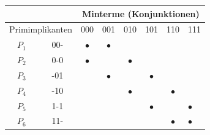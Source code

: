 \documentclass[12pt]{report}
\begin{document}
\begin{figure}[H]
  \begin{minipage}{0.6\textwidth}
    \begin{table}[H]
      \centering
      \begin{tabular}{|cc|cccccl|}
        \hline
                                              &     & \multicolumn{6}{c|}{Minterme (Konjunktionen)}                                                                                                                              \\ \hline
        \multicolumn{2}{|c|}{Primimplikanten} & 000 & 001                                           & 010                    & 101                    & 110                    & 111                                             \\ \hline
        \multicolumn{1}{|c|}{$P_1$}           & 00- & \color{blue} $\bullet$                        & \color{blue} $\bullet$ &                        &                        &                        &                        \\
        \multicolumn{1}{|c|}{$P_2$}           & 0-0 & \color{blue} $\bullet$                        &                        & \color{blue} $\bullet$ &                        &                        &                        \\
        \multicolumn{1}{|c|}{$P_3$}           & -01 &                                               & \color{blue} $\bullet$ &                        & \color{blue} $\bullet$ &                        &                        \\
        \multicolumn{1}{|c|}{$P_4$}           & -10 &                                               &                        & \color{blue} $\bullet$ &                        & \color{blue} $\bullet$ &                        \\
        \multicolumn{1}{|c|}{$P_5$}           & 1-1 &                                               &                        &                        & \color{blue} $\bullet$ &                        & \color{blue} $\bullet$ \\
        \multicolumn{1}{|c|}{$P_6$}           & 11- &                                               &                        &                        &                        & \color{blue} $\bullet$ & \color{blue} $\bullet$ \\ \hline
      \end{tabular}
    \end{table}
  \end{minipage}

\end{figure}
\end{document}
